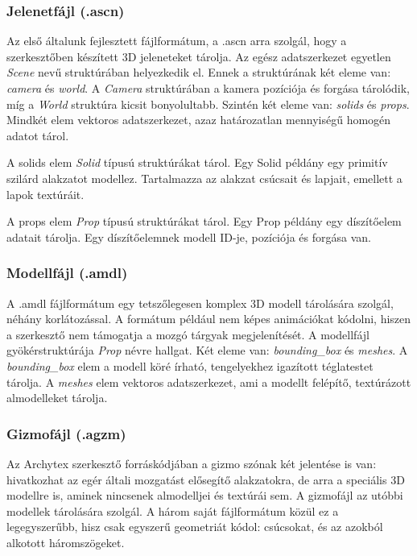 \subsubsection{Jelenetfájl (.ascn)}

Az első általunk fejlesztett fájlformátum, a .ascn arra szolgál, hogy a szerkesztőben készített
3D jeleneteket tárolja. Az egész adatszerkezet egyetlen \emph{Scene} nevű struktúrában helyezkedik
el. Ennek a struktúrának két eleme van: \emph{camera} és \emph{world}. A \emph{Camera} struktúrában
a kamera pozíciója és forgása tárolódik, míg a \emph{World} struktúra kicsit bonyolultabb. Szintén
két eleme van: \emph{solids} és \emph{props}. Mindkét elem vektoros adatszerkezet, azaz
határozatlan mennyiségű homogén adatot tárol.

A solids elem \emph{Solid} típusú struktúrákat tárol. Egy Solid példány egy primitív szilárd
alakzatot modellez. Tartalmazza az alakzat csúcsait és lapjait, emellett a lapok textúráit.

A props elem \emph{Prop} típusú struktúrákat tárol. Egy Prop példány egy díszítőelem adatait
tárolja. Egy díszítőelemnek modell ID-je, pozíciója és forgása van.

\subsubsection{Modellfájl (.amdl)}

A .amdl fájlformátum egy tetszőlegesen komplex 3D modell tárolására szolgál, néhány korlátozással.
A formátum például nem képes animációkat kódolni, hiszen a szerkesztő nem támogatja a mozgó tárgyak
megjelenítését. A modellfájl gyökérstruktúrája \emph{Prop} névre hallgat. Két eleme van:
\emph{bounding_box} és \emph{meshes}. A \emph{bounding_box} elem a modell köré írható, tengelyekhez
igazított téglatestet tárolja. A \emph{meshes} elem vektoros adatszerkezet, ami a modellt felépítő,
textúrázott almodelleket tárolja.

\subsubsection{Gizmofájl (.agzm)}

Az Archytex szerkesztő forráskódjában a gizmo szónak két jelentése is van: hivatkozhat az egér
általi mozgatást elősegítő alakzatokra, de arra a speciális 3D modellre is, aminek nincsenek
almodelljei és textúrái sem. A gizmofájl az utóbbi modellek tárolására szolgál. A három saját
fájlformátum közül ez a legegyszerűbb, hisz csak egyszerű geometriát kódol: csúcsokat, és az
azokból alkotott háromszögeket.